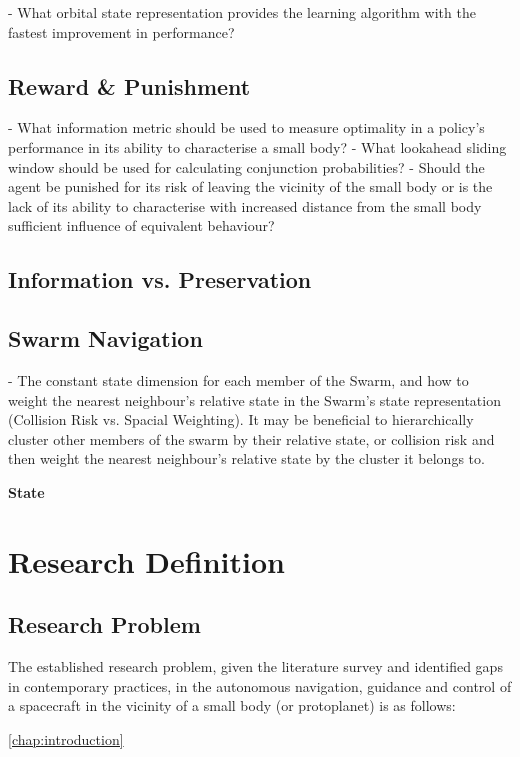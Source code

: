 - What orbital state representation provides the learning algorithm with the fastest improvement in performance? 

\subsection{Reward \& Punishment}

- What information metric should be used to measure optimality in a policy's performance in its ability to characterise a small body?
- What lookahead sliding window should be used for calculating conjunction probabilities?
- Should the agent be punished for its risk of leaving the vicinity of the small body or is the lack of its ability to characterise with increased distance from the small body sufficient influence of equivalent behaviour?

\subsection{Information vs. Preservation}

\subsection{Swarm Navigation}

- The constant state dimension for each member of the Swarm, and how to weight the nearest neighbour's relative state in the Swarm's state representation (Collision Risk vs. Spacial Weighting). It may be beneficial to hierarchically cluster other members of the swarm by their relative state, or collision risk and then weight the nearest neighbour's relative state by the cluster it belongs to. 

\textbf{State}

\section{Research Definition}

\subsection{Research Problem}

The established research problem, given the literature survey and identified gaps in contemporary practices, in the autonomous navigation, guidance and control of a spacecraft in the vicinity of a small body (or protoplanet) is as follows:

\autoref{chap:introduction}

